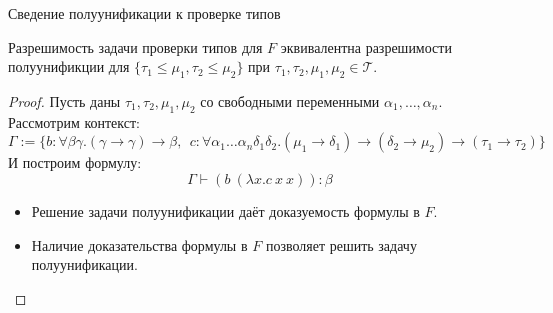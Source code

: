 \documentclass[aspectratio=169,dvipsnames,usenames]{beamer}
\begin{document}
\begin{frame}{Сведение полуунификации к проверке типов}
\begin{thm}Разрешимость задачи проверки типов для $F$ эквивалентна разрешимости
полуунификции для $\{\tau_1 \leq \mu_1, \tau_2 \leq \mu_2\}$ при $\tau_1,\tau_2,\mu_1,\mu_2\in\mathcal{T}$.
\end{thm}
\begin{proof}
Пусть даны $\tau_1,\tau_2,\mu_1,\mu_2$ со свободными переменными $\alpha_1,\dots,\alpha_n$.
Рассмотрим контекст:
$$\Gamma := \{ b:\forall\beta\gamma.(\gamma\rightarrow\gamma)\rightarrow\beta,\ \ 
             c:\forall\alpha_1\dots\alpha_n\delta_1\delta_2.(\mu_1\rightarrow\delta_1)\rightarrow(\delta_2\rightarrow\mu_2)\rightarrow(\tau_1\rightarrow\tau_2) \}$$
И построим формулу:
$$\Gamma\vdash (b\ (\lambda x.c\ x\ x)) : \beta$$

\begin{itemize}
\item Решение задачи полуунификации даёт доказуемость формулы в $F$.
\item Наличие доказательства формулы в $F$ позволяет решить задачу полуунификации.
\end{itemize}
\end{proof}
\end{frame}
\end{document}
